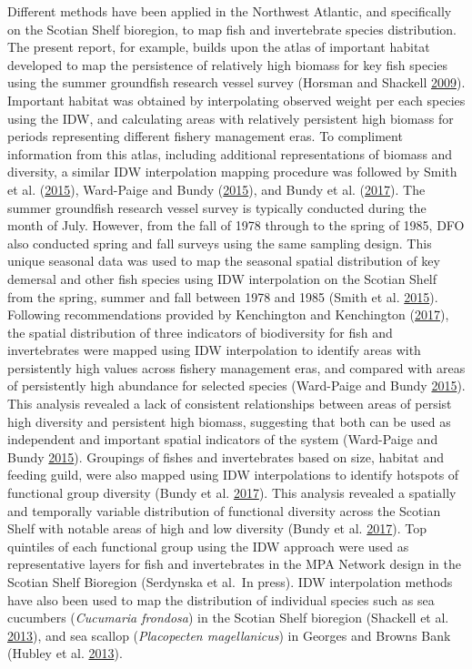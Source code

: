 \documentclass[12pt]{article}\usepackage[]{graphicx}\usepackage[]{color}
\begin{document}
Different methods have been applied in the Northwest Atlantic, and specifically on the Scotian Shelf bioregion, to map fish and invertebrate species distribution. The present report, for example, builds upon the atlas of important habitat developed to map the persistence of relatively high biomass for key fish species using the summer groundfish research vessel survey (Horsman and Shackell \protect\hyperlink{ref-Horsman:atlas:2009}{2009}). Important habitat was obtained by interpolating observed weight per each species using the IDW, and calculating areas with relatively persistent high biomass for periods representing different fishery management eras. To compliment information from this atlas, including additional representations of biomass and diversity, a similar IDW interpolation mapping procedure was followed by Smith et al. (\protect\hyperlink{ref-Smith2015}{2015}), Ward-Paige and Bundy (\protect\hyperlink{ref-WardPaige2016}{2015}), and Bundy et al. (\protect\hyperlink{ref-Bundyetal2017}{2017}). The summer groundfish research vessel survey is typically conducted during the month of July. However, from the fall of 1978 through to the spring of 1985, DFO also conducted spring and fall surveys using the same sampling design. This unique seasonal data was used to map the seasonal spatial distribution of key demersal and other fish species using IDW interpolation on the Scotian Shelf from the spring, summer and fall between 1978 and 1985 (Smith et al. \protect\hyperlink{ref-Smith2015}{2015}). Following recommendations provided by Kenchington and Kenchington (\protect\hyperlink{ref-Kenchingtons2013}{2017}), the spatial distribution of three indicators of biodiversity for fish and invertebrates were mapped using IDW interpolation to identify areas with persistently high values across fishery management eras, and compared with areas of persistently high abundance for selected species (Ward-Paige and Bundy \protect\hyperlink{ref-WardPaige2016}{2015}). This analysis revealed a lack of consistent relationships between areas of persist high diversity and persistent high biomass, suggesting that both can be used as independent and important spatial indicators of the system (Ward-Paige and Bundy \protect\hyperlink{ref-WardPaige2016}{2015}). Groupings of fishes and invertebrates based on size, habitat and feeding guild, were also mapped using IDW interpolations to identify hotspots of functional group diversity (Bundy et al. \protect\hyperlink{ref-Bundyetal2017}{2017}). This analysis revealed a spatially and temporally variable distribution of functional diversity across the Scotian Shelf with notable areas of high and low diversity (Bundy et al. \protect\hyperlink{ref-Bundyetal2017}{2017}). Top quintiles of each functional group using the IDW approach were used as representative layers for fish and invertebrates in the MPA Network design in the Scotian Shelf Bioregion (Serdynska et al.~In press). IDW interpolation methods have also been used to map the distribution of individual species such as sea cucumbers (\emph{Cucumaria frondosa}) in the Scotian Shelf bioregion (Shackell et al. \protect\hyperlink{ref-Shackell2013}{2013}), and sea scallop (\emph{Placopecten magellanicus}) in Georges and Browns Bank (Hubley et al. \protect\hyperlink{ref-Hubley2013}{2013}).
\end{document}
